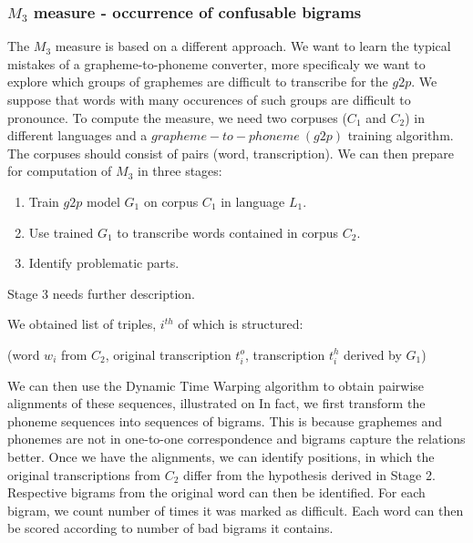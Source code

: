 \subsubsection{$M_3$ measure - occurrence of confusable bigrams}
\label{m3}
The $M_3$ measure is based on a different approach.
We want to learn the typical mistakes of a grapheme-to-phoneme converter, more specificaly we want to explore which groups of graphemes are difficult to transcribe for the $g2p$.
We suppose that words with many occurences of such groups are difficult to pronounce.
To compute the measure, we need two corpuses ($C_1$ and $C_2$) in different languages and a $grapheme-to-phoneme\:(g2p)$ training algorithm.
The corpuses should consist of pairs (word, transcription).
We can then prepare for computation of $M_3$ in three stages:
\begin{enumerate}
\item Train $g2p$ model $G_1$ on corpus $C_1$ in language $L_1$.
\item Use trained $G_1$ to transcribe words contained in corpus $C_2$.
\item Identify problematic parts.
\end{enumerate}
Stage 3 needs further description.
\par
We obtained list of triples, $i^{th}$ of which is structured:
\begin{center}
(word $w_i$ from $C_2$, original transcription $t^o_i$, transcription $t^h_i$ derived by $G_1$)
\end{center}
We can then use the Dynamic Time Warping algorithm to obtain pairwise alignments of these sequences, illustrated on 
In fact, we first transform the phoneme sequences into sequences of bigrams.
This is because graphemes and phonemes are not in one-to-one correspondence and bigrams capture the relations better.
Once we have the alignments, we can identify positions, in which the original transcriptions from $C_2$ differ from the hypothesis derived in Stage 2.
Respective bigrams from the original word can then be identified.
For each bigram, we count number of times it was marked as difficult.
Each word can then be scored according to number of bad bigrams it contains.
